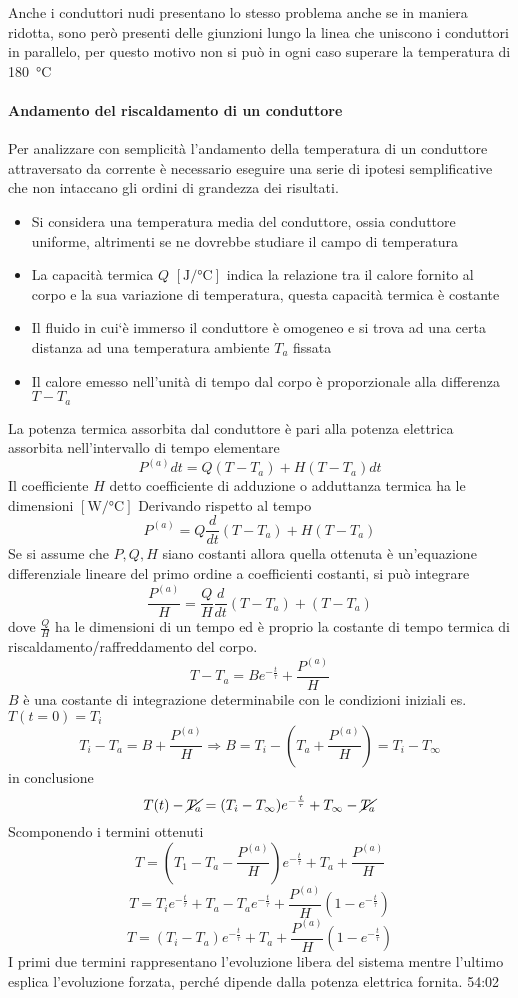 Anche i conduttori nudi presentano lo stesso problema anche se in maniera ridotta, sono però 
presenti delle giunzioni lungo la linea che uniscono i conduttori in parallelo, per questo
motivo non si può in ogni caso superare la temperatura di 
\SI{180}{\celsius}

\paragraph{Andamento del riscaldamento di un conduttore}
Per analizzare con semplicità l'andamento della temperatura di un conduttore attraversato
da corrente è necessario eseguire una serie di ipotesi semplificative che non intaccano
gli ordini di grandezza dei risultati.

\begin{itemize}
\item Si considera una temperatura media del conduttore, ossia conduttore uniforme,
altrimenti se ne dovrebbe studiare il campo di temperatura
\item La capacità termica $Q$ $[\si{\joule\per\celsius}]$ indica la relazione tra il calore 
fornito al corpo e la sua variazione di temperatura, questa capacità termica è costante
\item Il fluido in cui`è immerso il conduttore è omogeneo e si trova ad una certa distanza
ad una temperatura ambiente $T_a$ fissata
\item Il calore emesso nell'unità di tempo dal corpo è proporzionale alla differenza 
$T-T_a$
\end{itemize}

La potenza termica assorbita dal conduttore è pari alla potenza elettrica assorbita
nell'intervallo di tempo elementare
$$
P^{(a)} dt = Q(T-T_a) + H(T-T_a) dt
$$
Il coefficiente $H$ detto coefficiente di adduzione o adduttanza termica ha le dimensioni
$[\si{\watt\per\celsius}]$
Derivando rispetto al tempo
$$
P^{(a)} = Q \frac{d}{dt} (T-T_a) + H(T-T_a)
$$
Se si assume che $P, Q, H$ siano costanti allora quella ottenuta è un'equazione
differenziale lineare del primo ordine a coefficienti costanti, si può integrare 
$$
\frac{P^{(a)}}{H} = \frac{Q}{H} \frac{d}{dt} (T-T_a) + (T-T_a)
$$
dove $\frac{Q}{H}$ ha le dimensioni di un tempo ed è proprio la costante di tempo termica
di riscaldamento/raffreddamento del corpo.
$$
T-T_a = Be^{-\frac{t}{\tau}} + \frac{P^{(a)}}{H}
$$
$B$ è una costante di integrazione determinabile con le condizioni iniziali es.
$T(t=0) = T_i$
$$
T_i - T_a = B + \frac{P^{(a)}}{H} \Rightarrow B = T_i - \left(T_a + \frac{P^{(a)}}{H}\right) 
= T_i - T_\infty
$$
in conclusione
$$
T(t) - \cancel{T_a} = (T_i - T_\infty)e^{-\frac{t}{\tau}} + T_\infty - \cancel{T_a}
$$
Scomponendo i termini ottenuti
$$
T = \left(T_1-T_a-\frac{P^{(a)}}{H}\right)e^{-\frac{t}{\tau}} + T_a + \frac{P^{(a)}}{H} 
$$
$$
T = T_i e^{-\frac{t}{\tau}} + T_a - T_a e^{-\frac{t}{\tau}} + \frac{P^{(a)}}{H} 
\left(1 - e^{-\frac{t}{\tau}}\right)
$$
$$
T = (T_i - T_a)e^{-\frac{t}{\tau}} + T_a + \frac{P^{(a)}}{H} \left(1-e^{-\frac{t}{\tau}}\right)
$$
I primi due termini rappresentano l'evoluzione libera del sistema mentre l'ultimo esplica
l'evoluzione forzata, perché dipende dalla potenza elettrica fornita.
54:02
